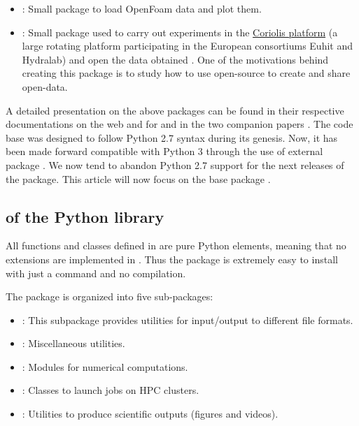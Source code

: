 \begin{itemize}
\item {}: Small package to load OpenFoam data and plot them.

\item {}: Small package used to carry out experiments in the
\href{http://www.legi.grenoble-inp.fr/web/spip.php?article757}{Coriolis platform}
(a large rotating platform participating in the European consortiums Euhit and
Hydralab) and open the data obtained \cite[see, for example,][]{ISSF2016}. One of
the motivations behind creating this package is to study how to use open-source to
create and share open-data.

\end{itemize}

A detailed presentation on the above packages can be found in their respective
documentations on the web and for  and  in the
two companion papers \cite[]{fluidfft, fluidsim}.
%
The code base was designed to follow Python 2.7 syntax during its genesis. Now,
it has been made forward compatible with Python 3 through the use of external
package .
%
We now tend to abandon Python 2.7 support for the next releases of the package.
%
This article will now focus on the base package \fluiddyn.

\subsection{of the Python library \fluiddyn}

All functions and classes defined in \fluiddyn are pure Python elements, meaning
that no extensions are implemented in \fluiddyn.  Thus the package \fluiddyn is
extremely easy to install with just a  command and no
compilation.

The package \fluiddyn is organized into five sub-packages:
\begin{itemize}
\item {}: This subpackage provides utilities for
input/output to different file formats.
\item {}: Miscellaneous utilities.
\item {}: Modules for numerical computations.
\item {}: Classes to launch jobs on HPC clusters.
\item {}: Utilities to produce scientific outputs
(figures and videos).
\end{itemize}

